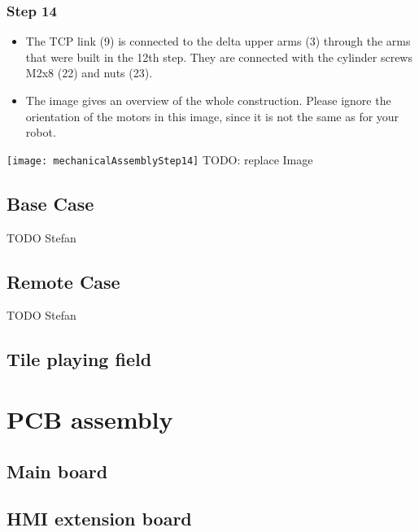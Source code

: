 \subsubsection{Step 14}

\begin{minipage}[t]{0.6\textwidth}
	\begin{itemize}
		\item The TCP link (9) is connected to the delta upper arms (3) through the arms that were built in the 12th step. They are connected with the cylinder screws M2x8 (22) and nuts (23).
		\item The image gives an overview of the whole construction. Please ignore the orientation of the motors in this image, since it is not the same as for your robot.
	\end{itemize}
\end{minipage}
\hfill
\begin{minipage}[t]{0.35\textwidth}
	\vspace{-\ht\strutbox}\texttt{[image: mechanicalAssemblyStep14]}
	TODO: replace Image
	\label{fig:MechanicalAssebmlyStep14} 
\end{minipage}

\subsection{Base Case}
TODO Stefan

\subsection{Remote Case}
TODO Stefan

\subsection{Tile playing field}

\section{PCB assembly}
\subsection{Main board}

\subsection{HMI extension board}


